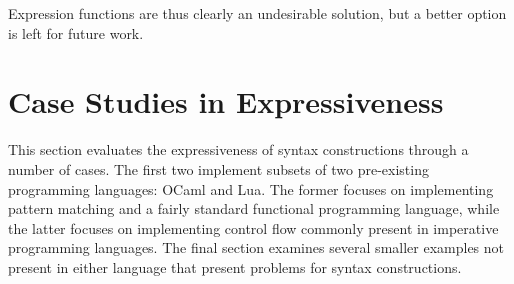 \documentclass{kththesis}
\begin{document}
Expression functions are thus clearly an undesirable solution, but a better option is left for future work.

\section{Case Studies in Expressiveness} \label{sec:case-studies}

This section evaluates the expressiveness of syntax constructions through a number of cases. The first two implement subsets of two pre-existing programming languages: OCaml and Lua. The former focuses on implementing pattern matching and a fairly standard functional programming language, while the latter focuses on implementing control flow commonly present in imperative programming languages. The final section examines several smaller examples not present in either language that present problems for syntax constructions.




\end{document}
